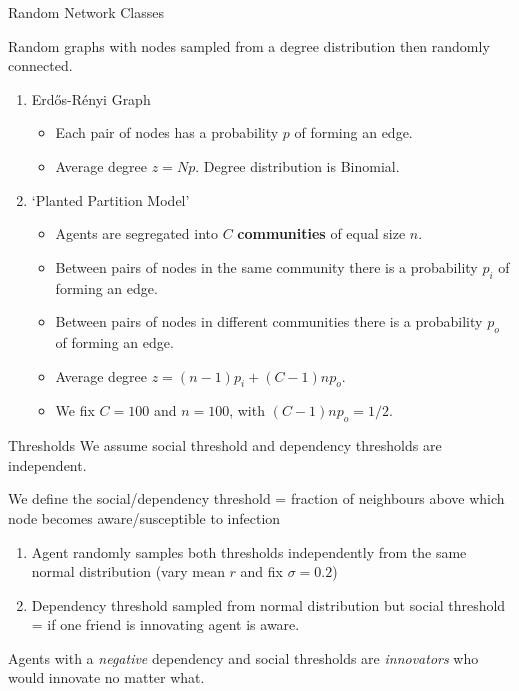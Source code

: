 \documentclass[10pt, xcolor=dvipsnames, handout]{beamer}
\begin{document}
\begin{frame}{Random Network Classes}

Random graphs with nodes sampled from a degree distribution then randomly connected.
\begin{enumerate}
\pause \item Erdős-Rényi Graph \cite{erdos_random_1959} \cite{newman_random_2001}
\begin{itemize}
\item Each pair of nodes has a probability $p$ of forming an edge.
\pause \item Average degree $z = Np$. Degree distribution is Binomial.
\end{itemize}
\pause \item `Planted Partition Model'\cite{karrer_stochastic_2011}
\begin{itemize}
\item Agents are segregated into $C$ \textbf{communities} of equal size $n$.
\pause \item Between pairs of nodes in the same community there is a probability $p_i$ of forming an edge.
\pause \item Between pairs of nodes in different communities there is a probability $p_o$ of forming an edge.
\pause \item Average degree $z = (n-1)p_i + (C-1)np_o$.
\pause \item We fix $C=100$ and $n=100$, with $(C-1)np_o = 1/2$.
\end{itemize}
\end{enumerate}
\end{frame}


\begin{frame}{Thresholds}
We assume social threshold and dependency thresholds are independent. \cite{lee_threshold_2014}

\pause We define the social/dependency threshold  = fraction of neighbours above which node becomes aware/susceptible to infection

\begin{enumerate}
\pause \item Agent randomly samples both thresholds independently from the same normal distribution (vary mean $r$ and fix $\sigma = 0.2$) \cite{gleeson_seed_2007}
\pause \item Dependency threshold sampled from normal distribution but social threshold = if one friend is innovating agent is aware.
\end{enumerate}

Agents with a \emph{negative} dependency and social thresholds are \emph{innovators} who would innovate no matter what.

\end{frame}
\end{document}
